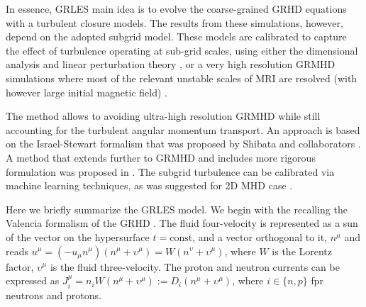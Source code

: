 In essence, \ac{GRLES} main idea is to evolve the coarse-grained \ac{GRHD} equations with a 
turbulent closure models. 
The results from these simulations, however, depend on the adopted subgrid model. 
These models are calibrated to capture the effect of turbulence operating at sub-grid scales,
using either the dimensional analysis and linear perturbation theory \citep{Radice:2017zta}, 
or a very high resolution \ac{GRMHD} simulations where most of the relevant unstable scales of \ac{MRI} 
are resolved (with however large initial magnetic field) \cite[\eg][]{Kiuchi:2017zzg}.
%

The method allows to avoiding ultra-high resolution \ac{GRMHD} while still accounting for the 
turbulent angular momentum transport. An approach is based on the Israel-Stewart formalism that was 
proposed by Shibata and collaborators \citep{Shibata:2017jyf}.
A method that extends further to \ac{GRMHD} and includes more rigorous formulation 
was proposed in \cite{Carrasco:2019uzl,Vigano:2020ouc}. 
The subgrid turbulence can be calibrated via machine learning techniques, as was suggested for 
2D \ac{MHD} case \citep{Rosofsky:2020}. 


Here we briefly summarize the \ac{GRLES} model. 
We begin with the recalling the Valencia formalism of the \ac{GRHD} \citep{Banyuls:1997}. 
The fluid four-velocity is represented as a sun of the vector on the hypersurface $t=\text{const}$, 
and a vector orthogonal to it, $n^{\mu}$ and reads
%
$ u^{\mu} = (-u_{\mu}n^{\mu})(n^{\mu}+\upsilon^{\mu}) = W(n^{\upsilon} + \upsilon^{\mu}) $, 
%
where $W$ is the Lorentz factor, $\upsilon^{\mu}$ is the fluid three-velocity.
%
The proton and neutron currents can be expressed as
$J^{\mu}_i = n_i W(n^{\mu} + \upsilon^{\mu}) := D_i (n^{\mu} + \upsilon^{\mu})$,
where $i\in\{n,p\}$ fpr neutrons and protons.
%
%


